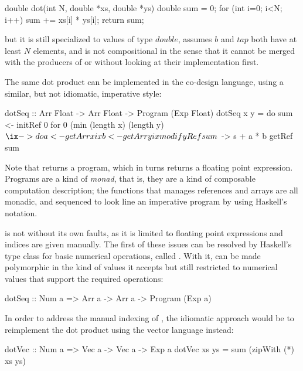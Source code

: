 \documentclass[../paper.tex]{subfiles}
\begin{document}
\begin{code}
double dot(int N, double *xs, double *ys) {
  double sum = 0;
  for (int i=0; i<N; i++) sum += xs[i] * ys[i];
  return sum;
}
\end{code}

\noindent but it is still specialized to values of type $double$, assumes $b$ and $tap$ both have at least $N$ elements, and is not compositional in the sense that it cannot be merged with the producers of  or  without looking at their implementation first.

The same dot product can be implemented in the co-design language, using a similar, but not idiomatic, imperative style:

\begin{code}
dotSeq :: Arr Float -> Arr Float -> Program (Exp Float)
dotSeq x y = do
  sum <- initRef 0
  for 0 (min (length x) (length y) $ \ix -> do
    a <- getArr x ix
    b <- getArr y ix
    modifyRef sum $ \s -> s + a * b
  getRef sum
\end{code}

\noindent Note that  returns a program, which in turns returns a floating point expression. Programs are a kind of \textit{monad}, that is, they are a kind of composable computation description; the functions that manages references and arrays are all monadic, and sequenced to look line an imperative program by using Haskell's  notation.

 is not without its own faults, as it is limited to floating point expressions and indices are given manually. The first of these issues can be resolved by Haskell's type class for basic numerical operations, called . With it,  can be made polymorphic in the kind of values it accepts but still restricted to numerical values that support the required operations:

\begin{code}
dotSeq :: Num a => Arr a -> Arr a -> Program (Exp a)
\end{code}

\noindent In order to address the manual indexing of , the idiomatic approach would be to reimplement the dot product using the vector language instead:

\begin{code}
dotVec :: Num a => Vec a -> Vec a -> Exp a
dotVec xs ys = sum (zipWith (*) xs ys)
\end{code}
\end{document}
